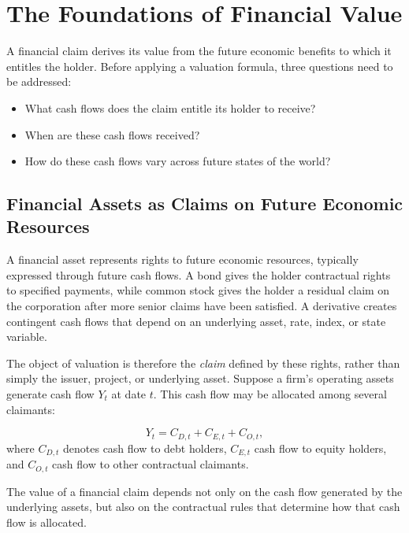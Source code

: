 \section{The Foundations of Financial Value}

A financial claim derives its value from the future economic benefits to which it entitles the holder. Before applying a valuation formula, three questions need to be addressed:


\begin{itemize}[
  leftmargin=2.2em,
  itemsep=0.45em,
  topsep=0.55em
]

\item What cash flows does the claim entitle its holder to receive?

\item When are these cash flows received?

\item How do these cash flows vary across future states of the world?

\end{itemize}

\subsection{Financial Assets as Claims on Future Economic Resources}

A financial asset represents rights to future economic resources, typically expressed through future cash flows.
A bond gives the holder contractual rights to specified payments, while common stock gives the holder a residual claim on the corporation after more senior claims have been satisfied. A derivative creates contingent cash flows that depend on an underlying asset, rate, index, or state variable.

The object of valuation is therefore the \emph{claim} defined by these rights, rather than simply the issuer, project, or underlying asset. Suppose a firm's operating assets generate cash flow $Y_t$ at date $t$. This cash flow may be allocated among several claimants:

\begin{equation}
Y_t=C_{D,t}+C_{E,t}+C_{O,t},
\label{eq:ch5-cash-flow-allocation}
\end{equation}
where $C_{D,t}$ denotes cash flow to debt holders, $C_{E,t}$ cash flow to equity holders, and $C_{O,t}$ cash flow to other contractual claimants.

The value of a financial claim depends not only on the cash flow generated by the underlying assets, but also on the contractual rules that determine how that cash flow is allocated.

